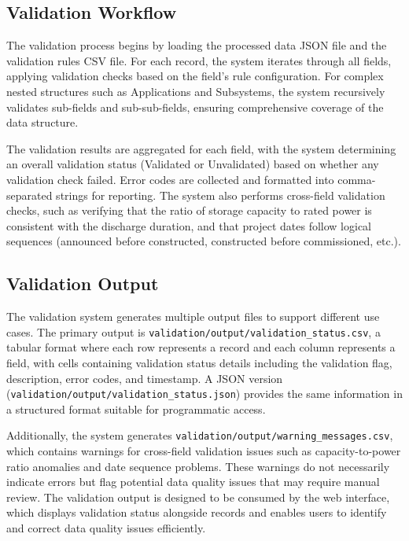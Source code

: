 \documentclass[11pt]{article}
\begin{document}
\subsection{Validation Workflow}

The validation process begins by loading the processed data JSON file and the validation rules CSV file. For each record, the system iterates through all fields, applying validation checks based on the field's rule configuration. For complex nested structures such as Applications and Subsystems, the system recursively validates sub-fields and sub-sub-fields, ensuring comprehensive coverage of the data structure.

The validation results are aggregated for each field, with the system determining an overall validation status (Validated or Unvalidated) based on whether any validation check failed. Error codes are collected and formatted into comma-separated strings for reporting. The system also performs cross-field validation checks, such as verifying that the ratio of storage capacity to rated power is consistent with the discharge duration, and that project dates follow logical sequences (announced before constructed, constructed before commissioned, etc.).

\subsection{Validation Output}

The validation system generates multiple output files to support different use cases. The primary output is \texttt{validation/output/validation\_status.csv}, a tabular format where each row represents a record and each column represents a field, with cells containing validation status details including the validation flag, description, error codes, and timestamp. A JSON version (\texttt{validation/output/validation\_status.json}) provides the same information in a structured format suitable for programmatic access.

Additionally, the system generates \texttt{validation/output/warning\_messages.csv}, which contains warnings for cross-field validation issues such as capacity-to-power ratio anomalies and date sequence problems. These warnings do not necessarily indicate errors but flag potential data quality issues that may require manual review. The validation output is designed to be consumed by the web interface, which displays validation status alongside records and enables users to identify and correct data quality issues efficiently.
\end{document}
